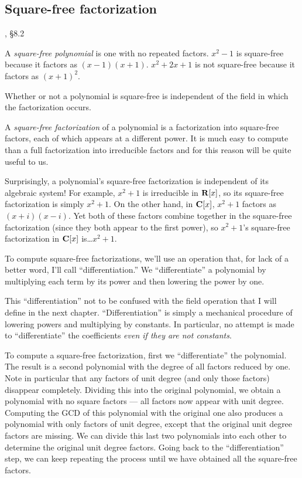 \subsection*{\qquad Square-free factorization}

\hbox{}\qquad [Geddes], \S 8.2

A {\it square-free polynomial} is one with no repeated factors.
$x^2-1$ is square-free because it factors as $(x-1)(x+1)$.  $x^2+2x+1$
is not square-free because it factors as $(x+1)^2$.

Whether or not a polynomial is square-free is independent of the field
in which the factorization occurs.

A {\it square-free factorization} of a polynomial is a factorization
into square-free factors, each of which appears at a different power.
It is much easy to compute than a full factorization into irreducible
factors and for this reason will be quite useful to us.

Surprisingly, a polynomial's square-free factorization is independent
of its algebraic system!  For example, $x^2+1$ is irreducible in ${\bf
R}[x]$, so its square-free factorization is simply $x^2+1$.  On the
other hand, in ${\bf C}[x]$, $x^2+1$ factors as $(x+i)(x-i)$.  Yet
both of these factors combine together in the square-free
factorization (since they both appear to the first power), so
$x^2+1$'s square-free factorization in ${\bf C}[x]$ is\ldots $x^2+1$.

To compute square-free factorizations, we'll use an operation that,
for lack of a better word, I'll call ``differentiation.''  We
``differentiate'' a polynomial by multiplying each term by its power
and then lowering the power by one.

This ``differentiation'' not to be confused with the field operation
that I will define in the next chapter.  ``Differentiation'' is simply
a mechanical procedure of lowering powers and multiplying by
constants.  In particular, no attempt is made to ``differentiate''
the coefficients {\it even if they are not constants}.

To compute a square-free factorization, first we ``differentiate'' the
polynomial.  The result is a second polynomial with the degree of all
factors reduced by one.  Note in particular that any factors of unit
degree (and only those factors) disappear completely.  Dividing this
into the original polynomial, we obtain a polynomial with no square
factors --- all factors now appear with unit degree.  Computing the
GCD of this polynomial with the original one also produces a
polynomial with only factors of unit degree, except that the original
unit degree factors are missing.  We can divide this last two
polynomials into each other to determine the original unit degree
factors.  Going back to the ``differentiation'' step, we can keep
repeating the process until we have obtained all the square-free
factors.




